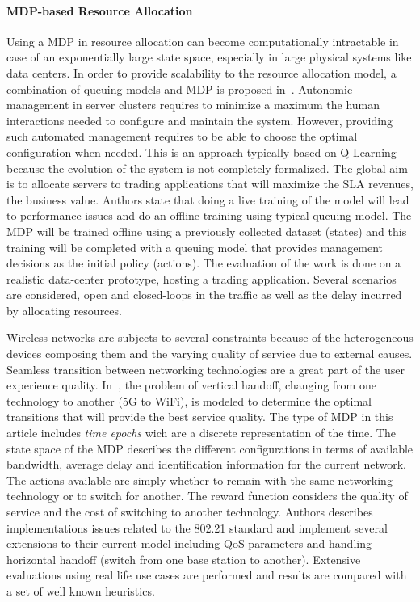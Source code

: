 \paragraph{MDP-based Resource Allocation}

Using a MDP in resource allocation can become computationally intractable in case of an exponentially large state space, especially in large physical systems like data centers. In order to provide scalability to the resource allocation model, a combination of queuing models and MDP is proposed in~\cite{Tesauro2006}.
Autonomic management in server clusters requires to minimize a maximum the human interactions needed to configure and maintain the system.
However, providing such automated management requires to be able to choose the optimal configuration when needed.
This is an approach typically based on Q-Learning because the evolution of the system is not completely formalized.
The global aim is to allocate servers to trading applications that will maximize the SLA revenues, \ie the business value.
Authors state that doing a live training of the model will lead to performance issues and do an offline training using typical queuing model. The MDP will be trained offline using a previously collected dataset (states) and this training will be completed with a queuing model that provides management decisions as the initial policy (actions).
The evaluation of the work is done on a realistic data-center prototype, hosting a trading application. 
Several scenarios are considered, open and closed-loops in the traffic as well as the delay incurred by allocating resources.

Wireless networks are subjects to several constraints because of the heterogeneous devices composing them and the varying quality of service due to external causes. Seamless transition between networking technologies are a great part of the user experience quality. In~\cite{navarro2008}, the problem of vertical handoff, \ie changing from one technology to another (\eg 5G to WiFi), is modeled to determine the optimal transitions that will provide the best service quality. 
The type of MDP in this article includes \textit{time epochs} wich are a discrete representation of the time.
The state space of the MDP describes the different configurations in terms of available bandwidth, average delay and identification information for the current network.
The actions available are simply whether to remain with the same networking technology or to switch for another. The reward function considers the quality of service and the cost of switching to another technology.
Authors describes implementations issues related to the 802.21 standard and implement several extensions to their current model including QoS parameters and handling horizontal handoff (\ie switch from one base station to another).
Extensive evaluations using real life use cases are performed and results are compared with a set of well known heuristics.


